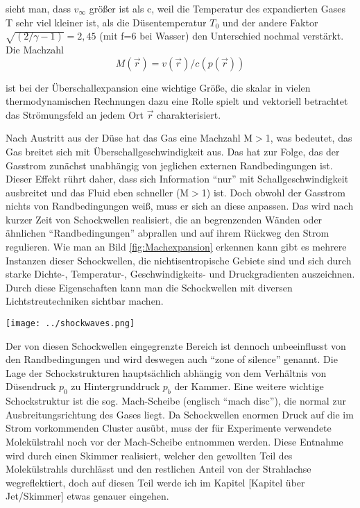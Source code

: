sieht man, dass $v_{\infty}$ größer ist als c, weil die Temperatur des expandierten Gases T sehr viel kleiner ist, als die Düsentemperatur $T_0$ und der andere Faktor $\sqrt{(2/\gamma -1)}=2,45$ (mit f=6 bei Wasser) den Unterschied nochmal verstärkt.\\
Die Machzahl 
\begin{equation}
M(\vec{r})= v(\vec{r})/c(p(\vec{r}))
\end{equation}

ist bei der Überschallexpansion eine wichtige Größe, die skalar in vielen thermodynamischen Rechnungen dazu eine Rolle spielt und vektoriell betrachtet das Strömungsfeld an jedem Ort $\vec{r}$ charakterisiert. 

Nach Austritt aus der Düse hat das Gas eine Machzahl M$>$1, was bedeutet, das Gas breitet sich mit Überschallgeschwindigkeit aus. Das hat zur Folge, das der Gasstrom zunächst unabhängig von jeglichen externen Randbedingungen ist. Dieser Effekt rührt daher, dass sich Information \enquote{nur} mit Schallgeschwindigkeit ausbreitet und das Fluid eben schneller (M$>$1) ist. Doch obwohl der Gasstrom nichts von Randbedingungen weiß, muss er sich an diese anpassen. Das wird nach kurzer Zeit von Schockwellen realisiert, die an begrenzenden Wänden oder ähnlichen \enquote{Randbedingungen} abprallen und auf ihrem Rückweg den Strom regulieren. Wie man an Bild \ref{fig:Machexpansion} erkennen kann gibt es mehrere Instanzen dieser Schockwellen, die nichtisentropische Gebiete sind und sich durch starke Dichte-, Temperatur-, Geschwindigkeits- und Druckgradienten auszeichnen. Durch diese Eigenschaften kann man die Schockwellen mit diversen Lichtstreutechniken sichtbar machen.
%
\begin{center}
\begin{minipage}{\linewidth}
\centering
\texttt{[image: ../shockwaves.png]}%
 \label{fig:Machexpansion}
\end{minipage} 
\end{center} 
% 
Der von diesen Schockwellen eingegrenzte Bereich ist dennoch unbeeinflusst von den Randbedingungen und wird deswegen auch \enquote{zone of silence} genannt. 
Die Lage der Schockstrukturen hauptsächlich abhängig von dem Verhältnis von Düsendruck $p_0$ zu Hintergrunddruck $p_b$ der Kammer. Eine weitere wichtige Schockstruktur ist die sog. Mach-Scheibe (englisch \enquote{mach disc}), die normal zur Ausbreitungsrichtung des Gases liegt. Da Schockwellen enormen Druck auf die im Strom vorkommenden Cluster ausübt, muss der für Experimente verwendete Molekülstrahl noch vor der Mach-Scheibe entnommen werden. Diese Entnahme wird durch einen Skimmer realisiert, welcher den gewollten Teil des Molekülstrahls durchlässt und den restlichen Anteil von der Strahlachse wegreflektiert, doch auf diesen Teil werde ich im Kapitel [Kapitel über Jet/Skimmer] etwas genauer eingehen. 


